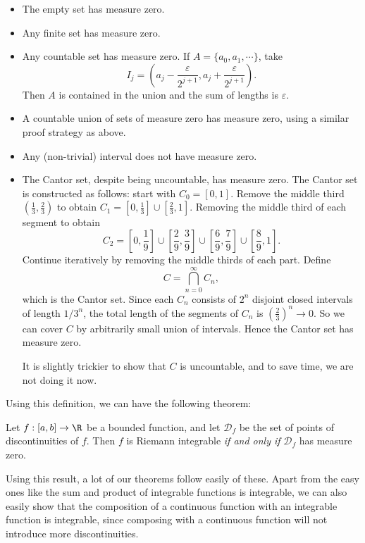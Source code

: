 \documentclass[a4paper]{article}
\begin{document}
\begin{eg}\leavevmode
  \begin{itemize}
    \item The empty set has measure zero.
    \item Any finite set has measure zero.
    \item Any countable set has measure zero. If $A = \{a_0, a_1, \cdots\}$, take
      \[
        I_j = \left(a_j - \frac{\varepsilon}{2^{j + 1}}, a_j + \frac{\varepsilon}{2^{j + 1}}\right).
      \]
      Then $A$ is contained in the union and the sum of lengths is $\varepsilon$.
    \item A countable union of sets of measure zero has measure zero, using a similar proof strategy as above.
    \item Any (non-trivial) interval does not have measure zero.
    \item The Cantor set, despite being uncountable, has measure zero. The Cantor set is constructed as follows: start with $C_0 = [0, 1]$. Remove the middle third $\left(\frac{1}{3}, \frac{2}{3}\right)$ to obtain $C_1 = \left[0, \frac{1}{3}\right] \cup \left[\frac{2}{3}, 1\right]$. Removing the middle third of each segment to obtain
      \[
        C_2 = \left[0, \frac{1}{9}\right] \cup \left[\frac{2}{9}, \frac{3}{9}\right] \cup \left[\frac{6}{9}, \frac{7}{9}\right]\cup \left[\frac{8}{9}, 1\right].
      \]
      Continue iteratively by removing the middle thirds of each part. Define
      \[
        C = \bigcap_{n = 0}^\infty C_n,
      \]
      which is the Cantor set. Since each $C_n$ consists of $2^n$ disjoint closed intervals of length $1/3^n$, the total length of the segments of $C_n$ is $\left(\frac{2}{3}\right)^n \to 0$. So we can cover $C$ by arbitrarily small union of intervals. Hence the Cantor set has measure zero.

      It is slightly trickier to show that $C$ is uncountable, and to save time, we are not doing it now.
  \end{itemize}
\end{eg}
Using this definition, we can have the following theorem:
\begin{thm}
  Let $f: [a, b] \to \R$ be a bounded function, and let $\mathcal{D}_f$ be the set of points of discontinuities of $f$. Then $f$ is Riemann integrable \emph{if and only if} $\mathcal{D}_f$ has measure zero.
\end{thm}
Using this result, a lot of our theorems follow easily of these. Apart from the easy ones like the sum and product of integrable functions is integrable, we can also easily show that the composition of a continuous function with an integrable function is integrable, since composing with a continuous function will not introduce more discontinuities.
\end{document}
